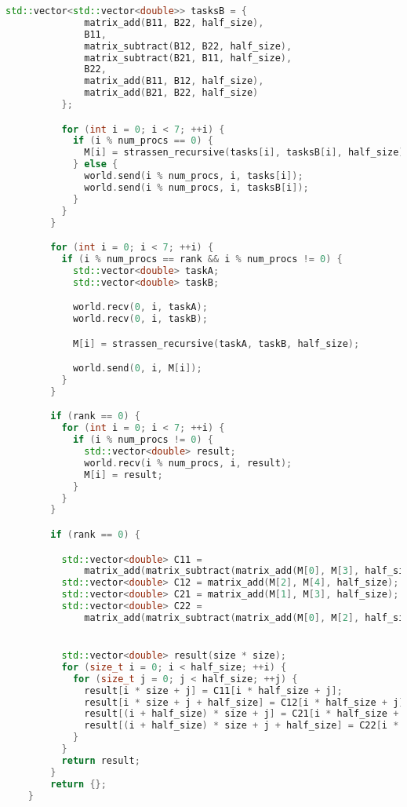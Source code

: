 \documentclass[a4paper,12pt]{article}
\begin{document}
\begin{lstlisting}[language=C++]
          std::vector<std::vector<double>> tasksB = {
              matrix_add(B11, B22, half_size),
              B11,
              matrix_subtract(B12, B22, half_size),
              matrix_subtract(B21, B11, half_size),
              B22,
              matrix_add(B11, B12, half_size),
              matrix_add(B21, B22, half_size)
          };

          for (int i = 0; i < 7; ++i) {
            if (i % num_procs == 0) {
              M[i] = strassen_recursive(tasks[i], tasksB[i], half_size);
            } else {
              world.send(i % num_procs, i, tasks[i]);
              world.send(i % num_procs, i, tasksB[i]);
            }
          }
        }

        for (int i = 0; i < 7; ++i) {
          if (i % num_procs == rank && i % num_procs != 0) {
            std::vector<double> taskA;
            std::vector<double> taskB;

            world.recv(0, i, taskA);
            world.recv(0, i, taskB);

            M[i] = strassen_recursive(taskA, taskB, half_size);

            world.send(0, i, M[i]);
          }
        }

        if (rank == 0) {
          for (int i = 0; i < 7; ++i) {
            if (i % num_procs != 0) {
              std::vector<double> result;
              world.recv(i % num_procs, i, result);
              M[i] = result;
            }
          }
        }

        if (rank == 0) {

          std::vector<double> C11 =
              matrix_add(matrix_subtract(matrix_add(M[0], M[3], half_size), M[4], half_size), M[6], half_size);
          std::vector<double> C12 = matrix_add(M[2], M[4], half_size);
          std::vector<double> C21 = matrix_add(M[1], M[3], half_size);
          std::vector<double> C22 =
              matrix_add(matrix_subtract(matrix_add(M[0], M[2], half_size), M[1], half_size), M[5], half_size);


          std::vector<double> result(size * size);
          for (size_t i = 0; i < half_size; ++i) {
            for (size_t j = 0; j < half_size; ++j) {
              result[i * size + j] = C11[i * half_size + j];
              result[i * size + j + half_size] = C12[i * half_size + j];
              result[(i + half_size) * size + j] = C21[i * half_size + j];
              result[(i + half_size) * size + j + half_size] = C22[i * half_size + j];
            }
          }
          return result;
        }
        return {};
    }
\end{lstlisting}
\end{document}
